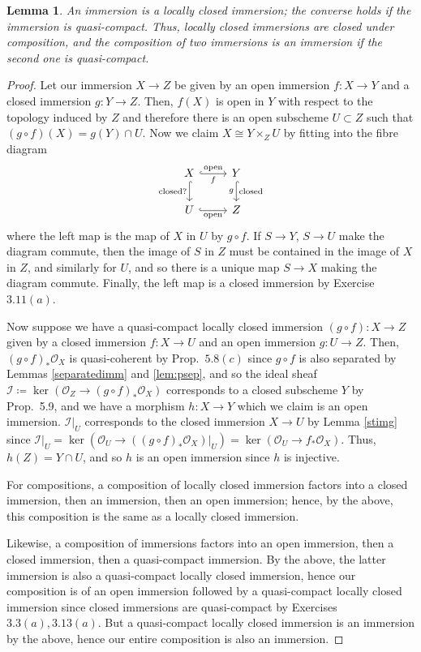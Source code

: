 \documentclass[10pt]{article}
\newtheorem{lemma}[subsubsection]{Lemma}
\theoremstyle{definition}
\theoremstyle{remark}
\numberwithin{equation}{section}
\numberwithin{figure}{subsubsection}
\newcommand{\II}{\mathscr{I}}
\newcommand{\OO}{\mathcal{O}}
\begin{document}
\begin{lemma}\label{immislcimm}
  An immersion is a locally closed immersion; the converse holds if the immersion is quasi-compact. Thus, locally closed immersions are closed under composition, and the composition of two immersions is an immersion if the second one is quasi-compact.
\end{lemma}
\begin{proof}
  Let our immersion $X \to Z$ be given by an open immersion $f\colon X \to Y$ and a closed immersion $g\colon Y \to Z$. Then, $f(X)$ is open in $Y$ with respect to the topology induced by $Z$ and therefore there is an open subscheme $U \subset Z$ such that $(g \circ f)(X) = g(Y) \cap U$. Now we claim $X \cong Y \times_Z U$ by fitting into the fibre diagram
  \begin{equation*}
    \begin{tikzcd}
      X \dar[hook,swap]{\text{closed?}}\rar[hook]{\text{open}}[swap]{f} & Y\dar[hook]{\text{closed}}[swap]{g}\\
      U \rar[hook,swap]{\text{open}} & Z
    \end{tikzcd}
  \end{equation*}
  where the left map is the map of $X$ in $U$ by $g \circ f$. If $S \to Y$, $S
  \to U$ make the diagram commute, then the image of $S$ in $Z$ must be
  contained in the image of $X$ in $Z$, and similarly for $U$, and so there is a
  unique map $S \to X$ making the diagram commute. Finally, the left map is a
  closed immersion by Exercise $3.11(a)$.
  \par Now suppose we have a quasi-compact locally closed immersion $(g \circ
  f)\colon X \to Z$ given by a closed immersion $f\colon X \to U$ and an open
  immersion $g \colon U \to Z$. Then, $(g \circ f)_*\OO_X$ is quasi-coherent by
  Prop.~$5.8(c)$ since $g \circ f$ is also separated by Lemmas
  \ref{separatedimm} and \ref{lem:psep}, and so the ideal sheaf $\II \coloneqq \ker(\OO_Z\to(g \circ f)_*\OO_X)$ corresponds to a closed subscheme $Y$ by Prop.~5.9, and we have a morphism $h\colon X \to Y$ which we claim is an open immersion. $\II\vert_U$ corresponds to the closed immersion $X \to U$ by Lemma \ref{stimg} since $\II\vert_U = \ker(\OO_U \to ((g \circ f)_*\OO_X)\vert_U) = \ker(\OO_U \to f_*\OO_X)$. Thus, $h(Z) = Y \cap U$, and so $h$ is an open immersion since $h$ is injective.
  \par For compositions, a composition of locally closed immersion factors into a closed immersion, then an immersion, then an open immersion; hence, by the above, this composition is the same as a locally closed immersion.
  \par Likewise, a composition of immersions factors into an open immersion,
  then a closed immersion, then a quasi-compact immersion. By the above, the
  latter immersion is also a quasi-compact locally closed immersion, hence our
  composition is of an open immersion followed by a quasi-compact locally closed
  immersion since closed immersions are quasi-compact by Exercises $3.3(a),3.13(a)$. But a quasi-compact locally closed immersion is an immersion by the above, hence our entire composition is also an immersion.
\end{proof}
\end{document}
